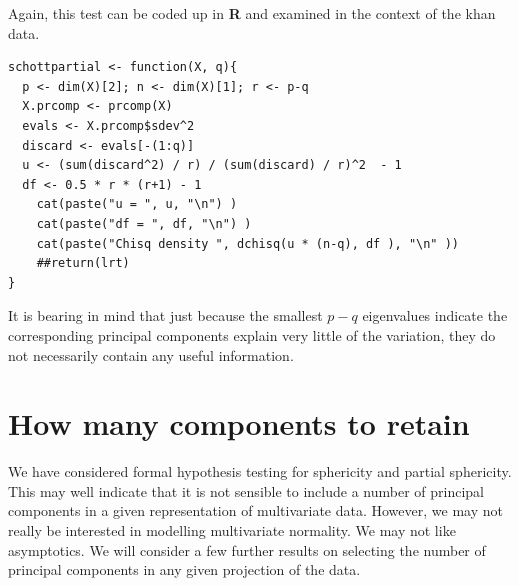 Again, this test can be coded up in \textbf{R} and examined in the context of the khan data.

\singlespacing
\begin{verbatim}
schottpartial <- function(X, q){
  p <- dim(X)[2]; n <- dim(X)[1]; r <- p-q
  X.prcomp <- prcomp(X)
  evals <- X.prcomp$sdev^2
  discard <- evals[-(1:q)]
  u <- (sum(discard^2) / r) / (sum(discard) / r)^2  - 1
  df <- 0.5 * r * (r+1) - 1
    cat(paste("u = ", u, "\n") )
    cat(paste("df = ", df, "\n") )
    cat(paste("Chisq density ", dchisq(u * (n-q), df ), "\n" ))
    ##return(lrt)
}
\end{verbatim}
\onehalfspacing




It is bearing in mind that just because the smallest $p-q$ eigenvalues indicate the corresponding principal components explain very little of the variation, they do not necessarily contain any useful information.







\section{How many components to retain}

We have considered formal hypothesis testing for sphericity and partial sphericity.   This may well indicate that it is not sensible to include a number of principal components in a given representation of multivariate data.   However, we may not really be interested in modelling multivariate normality.   We may not like asymptotics.   We will consider a few further results on selecting the number of principal components in any given projection of the data.


